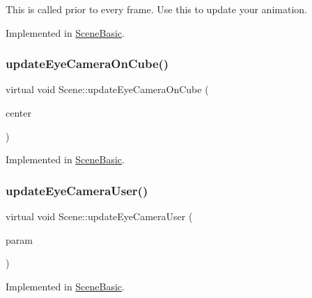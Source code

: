 This is called prior to every frame. Use this to update your animation. 

Implemented in \hyperlink{class_scene_basic_a40b11f479361056d418edbf0a14c9a59}{Scene\+Basic}.

\hypertarget{class_scene_a04ae3637cb26c4ad95004372d5a63654}{}\label{class_scene_a04ae3637cb26c4ad95004372d5a63654} 
\subsubsection{\texorpdfstring{update\+Eye\+Camera\+On\+Cube()}{updateEyeCameraOnCube()}}
{\footnotesize\ttfamily virtual void Scene\+::update\+Eye\+Camera\+On\+Cube (\begin{DoxyParamCaption}\item[{std\+::vector$<$ double $>$}]{center }\end{DoxyParamCaption})\hspace{0.3cm}{\ttfamily [pure virtual]}}



Implemented in \hyperlink{class_scene_basic_a3fa1c3ba519581687c7fe7214af8cc58}{Scene\+Basic}.

\hypertarget{class_scene_a52181459b75a0c2f4706a26f3e200ca1}{}\label{class_scene_a52181459b75a0c2f4706a26f3e200ca1} 
\subsubsection{\texorpdfstring{update\+Eye\+Camera\+User()}{updateEyeCameraUser()}}
{\footnotesize\ttfamily virtual void Scene\+::update\+Eye\+Camera\+User (\begin{DoxyParamCaption}\item[{\hyperlink{structset_of_view}{set\+Of\+View}}]{param }\end{DoxyParamCaption})\hspace{0.3cm}{\ttfamily [pure virtual]}}



Implemented in \hyperlink{class_scene_basic_abcd244d71f229f3d7c7133818c5e1898}{Scene\+Basic}.

\hypertarget{class_scene_a0813a564a23d9a2d0a965d5bf422c1fd}{}\label{class_scene_a0813a564a23d9a2d0a965d5bf422c1fd} 
